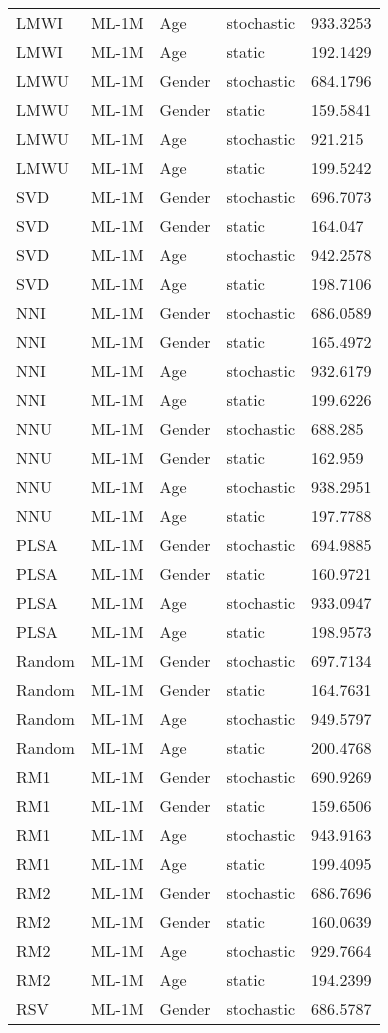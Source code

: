 \begin{center}
\begin{longtable}{|l|l|l|l|l|}
LMWI&ML-1M&Age&stochastic&933.3253\\
LMWI&ML-1M&Age&static&192.1429\\
LMWU&ML-1M&Gender&stochastic&684.1796\\
LMWU&ML-1M&Gender&static&159.5841\\
LMWU&ML-1M&Age&stochastic&921.215\\
LMWU&ML-1M&Age&static&199.5242\\
SVD&ML-1M&Gender&stochastic&696.7073\\
SVD&ML-1M&Gender&static&164.047\\
SVD&ML-1M&Age&stochastic&942.2578\\
SVD&ML-1M&Age&static&198.7106\\
NNI&ML-1M&Gender&stochastic&686.0589\\
NNI&ML-1M&Gender&static&165.4972\\
NNI&ML-1M&Age&stochastic&932.6179\\
NNI&ML-1M&Age&static&199.6226\\
NNU&ML-1M&Gender&stochastic&688.285\\
NNU&ML-1M&Gender&static&162.959\\
NNU&ML-1M&Age&stochastic&938.2951\\
NNU&ML-1M&Age&static&197.7788\\
PLSA&ML-1M&Gender&stochastic&694.9885\\
PLSA&ML-1M&Gender&static&160.9721\\
PLSA&ML-1M&Age&stochastic&933.0947\\
PLSA&ML-1M&Age&static&198.9573\\
Random&ML-1M&Gender&stochastic&697.7134\\
Random&ML-1M&Gender&static&164.7631\\
Random&ML-1M&Age&stochastic&949.5797\\
Random&ML-1M&Age&static&200.4768\\
RM1&ML-1M&Gender&stochastic&690.9269\\
RM1&ML-1M&Gender&static&159.6506\\
RM1&ML-1M&Age&stochastic&943.9163\\
RM1&ML-1M&Age&static&199.4095\\
RM2&ML-1M&Gender&stochastic&686.7696\\
RM2&ML-1M&Gender&static&160.0639\\
RM2&ML-1M&Age&stochastic&929.7664\\
RM2&ML-1M&Age&static&194.2399\\
RSV&ML-1M&Gender&stochastic&686.5787\\

\end{longtable}
\end{center}
